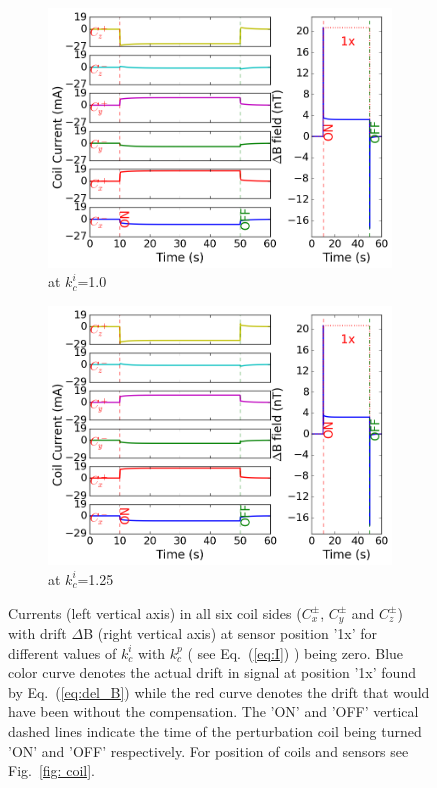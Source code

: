 \begin{figure}[!htb]
    \begin{subfigure}{.5\linewidth}
        \centering
        \includegraphics[width=\linewidth, height= 6.5 cm]{Images/i100_33}
        \caption{at $k_c^i$=1.0}
        \label{fig:i75}
    \end{subfigure}%
        \begin{subfigure}{.5\linewidth}
        \centering
        \includegraphics[width=\linewidth, height= 6.5 cm]{Images/i125_33}
        \caption{at $k_c^i$=1.25}
        \label{fig:i100}
    \end{subfigure}

    \caption{Currents (left vertical axis) in all six coil sides ($C_x^\pm$, $C_y^\pm$ and $C_z^\pm$) with drift $\Delta$B (right vertical axis) at sensor position '1x' for different values of $k_c^i$ with $k_c^p$ ( see Eq.~(\ref{eq:I}) ) being zero. Blue color curve denotes the actual drift in signal at position '1x' found by Eq.~(\ref{eq:del_B}) while the red curve denotes the drift that would have been without the compensation. The 'ON' and 'OFF' vertical dashed lines indicate the time of the perturbation coil being turned 'ON' and 'OFF' respectively. For position of coils and sensors see Fig.~\ref{fig: coil}.}
    \label{fig:i_pi}
\end{figure}

